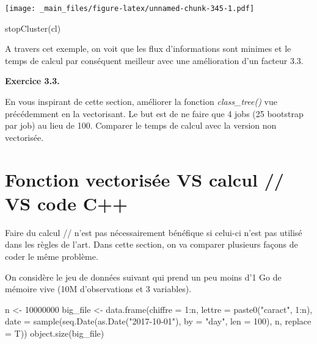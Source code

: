 \documentclass[
]{book}
\newenvironment{Shaded}{\begin{snugshade}}{\end{snugshade}}
\newcommand{\AttributeTok}[1]{\textcolor[rgb]{0.77,0.63,0.00}{#1}}
\newcommand{\DecValTok}[1]{\textcolor[rgb]{0.00,0.00,0.81}{#1}}
\newcommand{\FunctionTok}[1]{\textcolor[rgb]{0.00,0.00,0.00}{#1}}
\newcommand{\NormalTok}[1]{#1}
\newcommand{\OtherTok}[1]{\textcolor[rgb]{0.56,0.35,0.01}{#1}}
\newcommand{\SpecialCharTok}[1]{\textcolor[rgb]{0.00,0.00,0.00}{#1}}
\newcommand{\StringTok}[1]{\textcolor[rgb]{0.31,0.60,0.02}{#1}}
\theoremstyle{definition}
\theoremstyle{definition}
\theoremstyle{definition}
\theoremstyle{definition}
\theoremstyle{remark}
\begin{document}
\texttt{[image: \_main\_files/figure-latex/unnamed-chunk-345-1.pdf]}

\begin{Shaded}
\begin{Highlighting}[]
\FunctionTok{stopCluster}\NormalTok{(cl) }
\end{Highlighting}
\end{Shaded}

A travers cet exemple, on voit que les flux d'informations sont minimes et le temps de calcul par conséquent meilleur avec une amélioration d'un facteur 3.3.

\textbf{Exercice 3.3.}

En vous inspirant de cette section, améliorer la fonction \emph{class\_tree()} vue précédemment en la vectorisant. Le but est de ne faire que 4 jobs (25 bootstrap par job) au lieu de 100. Comparer le temps de calcul avec la version non vectorisée.

\hypertarget{fonction-vectorisuxe9e-vs-calcul-vs-code-c}{%
\section{\texorpdfstring{Fonction vectorisée VS calcul // VS code \textbf{C++}}{Fonction vectorisée VS calcul // VS code C++}}\label{fonction-vectorisuxe9e-vs-calcul-vs-code-c}}

Faire du calcul // n'est pas nécessairement bénéfique si celui-ci n'est pas utilisé dans les règles de l'art. Dans cette section, on va comparer plusieurs façons de coder le même problème.

On considère le jeu de données suivant qui prend un peu moins d'1 Go de mémoire vive (10M d'observations et 3 variables).

\begin{Shaded}
\begin{Highlighting}[]
\NormalTok{n }\OtherTok{\textless{}{-}} \DecValTok{10000000} 
\NormalTok{big\_file }\OtherTok{\textless{}{-}} \FunctionTok{data.frame}\NormalTok{(}\AttributeTok{chiffre =} \DecValTok{1}\SpecialCharTok{:}\NormalTok{n,}
                       \AttributeTok{lettre =} \FunctionTok{paste0}\NormalTok{(}\StringTok{"caract"}\NormalTok{, }\DecValTok{1}\SpecialCharTok{:}\NormalTok{n), }
                       \AttributeTok{date =} \FunctionTok{sample}\NormalTok{(}\FunctionTok{seq.Date}\NormalTok{(}\FunctionTok{as.Date}\NormalTok{(}\StringTok{"2017{-}10{-}01"}\NormalTok{),}
                                        \AttributeTok{by =} \StringTok{"day"}\NormalTok{, }\AttributeTok{len =} \DecValTok{100}\NormalTok{), n,}
                                     \AttributeTok{replace =}\NormalTok{ T))}
\FunctionTok{object.size}\NormalTok{(big\_file)}
\end{Highlighting}
\end{Shaded}
\end{document}
